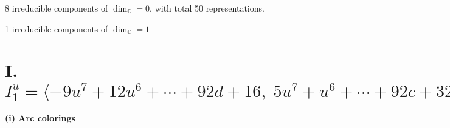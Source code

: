 \documentclass[1p]{elsarticle_modified}
\theoremstyle{definition}
\begin{document}
\raggedright * 8 irreducible components of $\dim_{\mathbb{C}}=0$, with total 50 representations.\\
\raggedright * 1 irreducible components of $\dim_{\mathbb{C}}=1$ \\
\newpage
\renewcommand{\arraystretch}{1}
\centering \section*{I. $I^u_{1}= \langle -9 u^7+12 u^6+\cdots+92 d+16,\;5 u^7+u^6+\cdots+92 c+32,\;-3 u^7+4 u^6+\cdots+46 b-10,\;4 u^7-13 u^6+\cdots+92 a-48,\;u^8- u^7+\cdots+4 u-4 \rangle$}
\flushleft \textbf{(i) Arc colorings}\\
\end{document}

